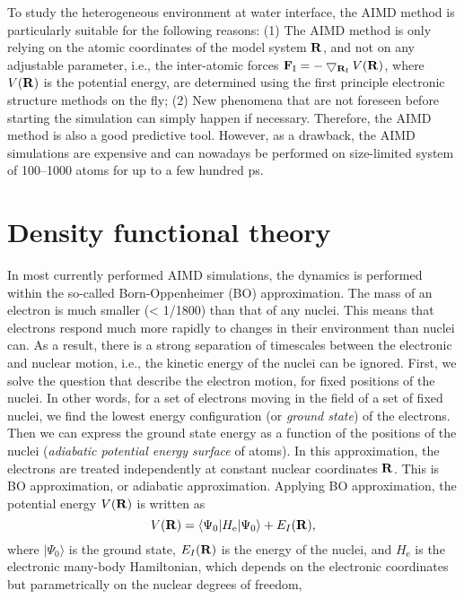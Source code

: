 To study the heterogeneous environment at water interface, the AIMD method is particularly suitable for the following reasons:
(1) The AIMD method is only relying on the atomic coordinates of the model system $\bf R$, and not on any adjustable parameter, 
i.e., the inter-atomic forces ${\bf F}_{\text{I}}=-\bigtriangledown_{{\bf R}_{\text{I}}}V({\bf R})$, where $V({\bf R})$ is the potential energy\cite{VandeVondele2004},
are determined using the first principle electronic structure methods on the fly; 
(2) New phenomena that are not foreseen before starting the simulation can simply happen if necessary.
Therefore, the AIMD method is also a good predictive tool. 
However, as a drawback, the AIMD simulations are expensive and can nowadays be performed on size-limited system of 100--1000 atoms for up to a few hundred ps. 

\section{Density functional theory} \label{section_DFT}
In most currently performed AIMD simulations, the dynamics is performed within the so-called Born-Oppenheimer (BO) approximation\cite{Born1927}.
The mass of an electron is much smaller (< 1/1800) than that of any nuclei. 
This means that electrons respond much more rapidly to changes in their 
environment than nuclei can. 
As a result, there is a strong separation of timescales between the electronic and nuclear motion, i.e., the kinetic energy of the nuclei can be ignored.
First, we solve the question that describe the electron motion, for fixed positions of the nuclei. In other words, for a set of electrons moving in the field of a set of fixed nuclei, we find the lowest energy configuration (or \emph{ground state}) of the electrons. 
Then we can express the ground state energy as a function of the positions of the nuclei (\emph{adiabatic potential energy surface} of atoms).
In this approximation, the electrons are treated independently at constant nuclear coordinates $\bf R$. This is BO approximation, or adiabatic approximation. 
Applying BO approximation, the potential energy $V(\bf R)$ is  written as
\begin{equation}
  V({\bf R})=\langle \Psi_0 | H_{\text{e}} | \Psi_0 \rangle + E_{I}({\bf R}),
\label{eq:BO}
\end{equation}
where $|\Psi_0\rangle$ is the ground state, 
$E_I({\bf R})$ is the energy of the nuclei,
and $H_{\text{e}}$ is the electronic many-body Hamiltonian, which depends on the electronic 
coordinates but parametrically on the nuclear degrees of freedom, 


